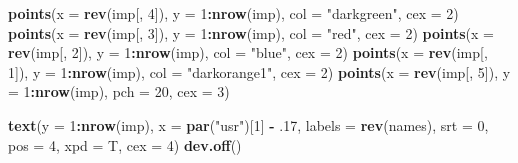 \documentclass[]{book}
\newenvironment{Shaded}{\begin{snugshade}}{\end{snugshade}}
\newcommand{\KeywordTok}[1]{\textcolor[rgb]{0.13,0.29,0.53}{\textbf{{#1}}}}
\newcommand{\DataTypeTok}[1]{\textcolor[rgb]{0.13,0.29,0.53}{{#1}}}
\newcommand{\DecValTok}[1]{\textcolor[rgb]{0.00,0.00,0.81}{{#1}}}
\newcommand{\StringTok}[1]{\textcolor[rgb]{0.31,0.60,0.02}{{#1}}}
\newcommand{\OperatorTok}[1]{\textcolor[rgb]{0.81,0.36,0.00}{\textbf{{#1}}}}
\newcommand{\NormalTok}[1]{{#1}}
\theoremstyle{definition}
\theoremstyle{definition}
\theoremstyle{definition}
\theoremstyle{remark}
\begin{document}
\begin{Shaded}
\begin{Highlighting}[]
\KeywordTok{points}\NormalTok{(}\DataTypeTok{x =} \KeywordTok{rev}\NormalTok{(imp[, }\DecValTok{4}\NormalTok{]), }\DataTypeTok{y =} \DecValTok{1}\OperatorTok{:}\KeywordTok{nrow}\NormalTok{(imp), }\DataTypeTok{col =} \StringTok{"darkgreen"}\NormalTok{, }\DataTypeTok{cex =} \DecValTok{2}\NormalTok{)}
\KeywordTok{points}\NormalTok{(}\DataTypeTok{x =} \KeywordTok{rev}\NormalTok{(imp[, }\DecValTok{3}\NormalTok{]), }\DataTypeTok{y =} \DecValTok{1}\OperatorTok{:}\KeywordTok{nrow}\NormalTok{(imp), }\DataTypeTok{col =} \StringTok{"red"}\NormalTok{, }\DataTypeTok{cex =} \DecValTok{2}\NormalTok{)}
\KeywordTok{points}\NormalTok{(}\DataTypeTok{x =} \KeywordTok{rev}\NormalTok{(imp[, }\DecValTok{2}\NormalTok{]), }\DataTypeTok{y =} \DecValTok{1}\OperatorTok{:}\KeywordTok{nrow}\NormalTok{(imp), }\DataTypeTok{col =} \StringTok{"blue"}\NormalTok{, }\DataTypeTok{cex =} \DecValTok{2}\NormalTok{)}
\KeywordTok{points}\NormalTok{(}\DataTypeTok{x =} \KeywordTok{rev}\NormalTok{(imp[, }\DecValTok{1}\NormalTok{]), }\DataTypeTok{y =} \DecValTok{1}\OperatorTok{:}\KeywordTok{nrow}\NormalTok{(imp), }\DataTypeTok{col =} \StringTok{"darkorange1"}\NormalTok{, }\DataTypeTok{cex =} \DecValTok{2}\NormalTok{)}
\KeywordTok{points}\NormalTok{(}\DataTypeTok{x =} \KeywordTok{rev}\NormalTok{(imp[, }\DecValTok{5}\NormalTok{]), }\DataTypeTok{y =} \DecValTok{1}\OperatorTok{:}\KeywordTok{nrow}\NormalTok{(imp), }\DataTypeTok{pch =} \DecValTok{20}\NormalTok{, }\DataTypeTok{cex =} \DecValTok{3}\NormalTok{)}


\KeywordTok{text}\NormalTok{(}\DataTypeTok{y =} \DecValTok{1}\OperatorTok{:}\KeywordTok{nrow}\NormalTok{(imp), }\DataTypeTok{x =} \KeywordTok{par}\NormalTok{(}\StringTok{"usr"}\NormalTok{)[}\DecValTok{1}\NormalTok{] }\OperatorTok{-}\StringTok{ }\NormalTok{.}\DecValTok{17}\NormalTok{, }\DataTypeTok{labels =} \KeywordTok{rev}\NormalTok{(names),}
     \DataTypeTok{srt =} \DecValTok{0}\NormalTok{, }\DataTypeTok{pos =} \DecValTok{4}\NormalTok{, }\DataTypeTok{xpd =}\NormalTok{ T, }\DataTypeTok{cex =} \DecValTok{4}\NormalTok{)}
\KeywordTok{dev.off}\NormalTok{()}
\end{Highlighting}
\end{Shaded}
\end{document}
